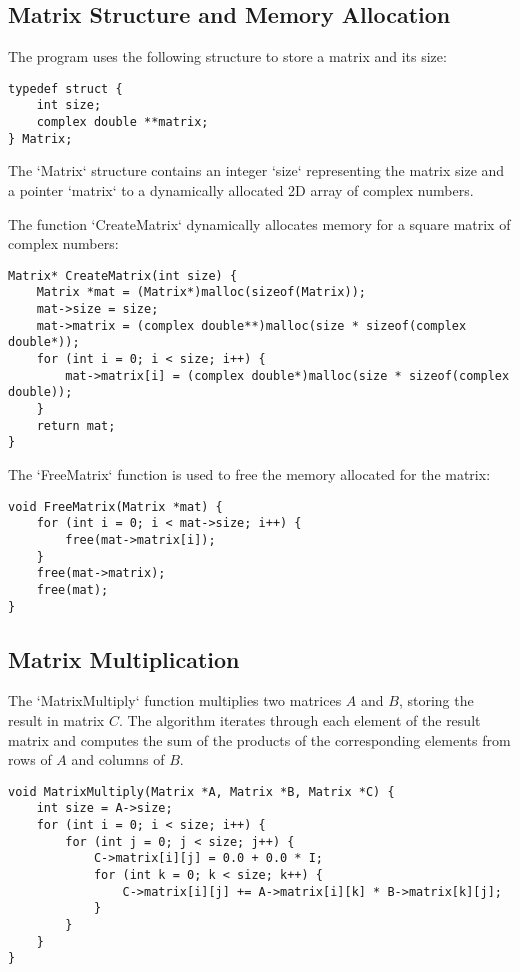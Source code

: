 \documentclass[article]{IEEEtran}
\numberwithin{equation}{enumi}
\numberwithin{figure}{enumi}
\begin{document}
\subsection*{Matrix Structure and Memory Allocation}
The program uses the following structure to store a matrix and its size:

\begin{lstlisting}[caption={Matrix Structure Definition}]
typedef struct {
    int size;
    complex double **matrix;
} Matrix;
\end{lstlisting}

The `Matrix` structure contains an integer `size` representing the matrix size and a pointer `matrix` to a dynamically allocated 2D array of complex numbers.

The function `CreateMatrix` dynamically allocates memory for a square matrix of complex numbers:

\begin{lstlisting}[caption={Matrix Creation Function}]
Matrix* CreateMatrix(int size) {
    Matrix *mat = (Matrix*)malloc(sizeof(Matrix));
    mat->size = size;
    mat->matrix = (complex double**)malloc(size * sizeof(complex double*));
    for (int i = 0; i < size; i++) {
        mat->matrix[i] = (complex double*)malloc(size * sizeof(complex double));
    }
    return mat;
}
\end{lstlisting}

The `FreeMatrix` function is used to free the memory allocated for the matrix:

\begin{lstlisting}[caption={Matrix Free Function}]
void FreeMatrix(Matrix *mat) {
    for (int i = 0; i < mat->size; i++) {
        free(mat->matrix[i]);
    }
    free(mat->matrix);
    free(mat);
}
\end{lstlisting}

\subsection*{Matrix Multiplication}
The `MatrixMultiply` function multiplies two matrices \(A\) and \(B\), storing the result in matrix \(C\). The algorithm iterates through each element of the result matrix and computes the sum of the products of the corresponding elements from rows of \(A\) and columns of \(B\).

\begin{lstlisting}[caption={Matrix Multiplication Function}]
void MatrixMultiply(Matrix *A, Matrix *B, Matrix *C) {
    int size = A->size;
    for (int i = 0; i < size; i++) {
        for (int j = 0; j < size; j++) {
            C->matrix[i][j] = 0.0 + 0.0 * I;
            for (int k = 0; k < size; k++) {
                C->matrix[i][j] += A->matrix[i][k] * B->matrix[k][j];
            }
        }
    }
}
\end{lstlisting}
\end{document}
